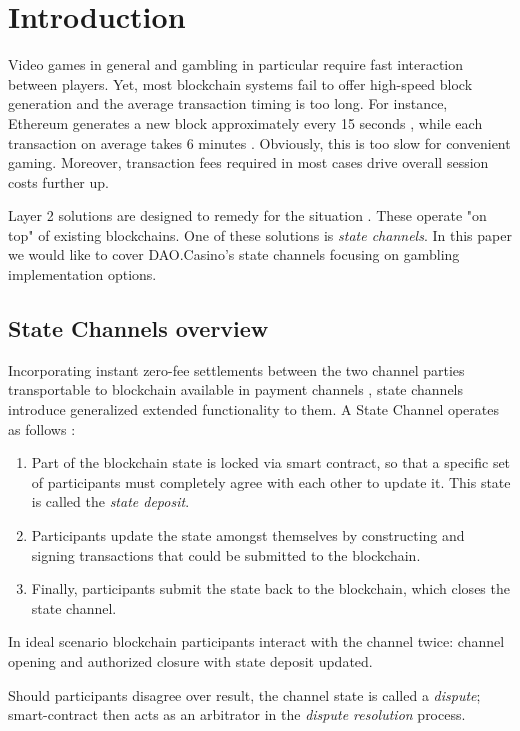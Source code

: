 \section{Introduction}
	Video games in general and gambling in particular require fast interaction between players. Yet, most blockchain systems fail to offer high-speed block generation and the average transaction timing is too long. For instance, Ethereum generates a new block approximately every 15 seconds \cite{bib2}, while each transaction on average takes 6 minutes \cite{bib3}. Obviously, this is too slow for convenient gaming. Moreover, transaction fees required in most cases drive overall session costs further up.


	Layer 2 solutions are designed to remedy for the situation \cite{bib4}. These operate "on top" of existing blockchains. One of these solutions is \textit{state channels}. In this paper we would like to cover DAO.Casino's state channels focusing on gambling implementation options.


		\subsection {State Channels overview}
	Incorporating instant zero-fee settlements between the two channel parties transportable to blockchain available in payment channels \cite{bib11}, state channels introduce generalized extended functionality to them. 
	A State Channel operates as follows \cite{bib5}:
	\begin{enumerate}
		\item Part of the blockchain state is locked via smart contract, so that a specific set of participants must completely agree with each other to update it. This state is called the \textit {state deposit}.
		\item Participants update the state amongst themselves by constructing and signing transactions that could be submitted to the blockchain.
		\item Finally, participants submit the state back to the blockchain, which closes the state channel.
	\end{enumerate}

	In ideal scenario blockchain participants interact with the channel twice: channel opening and authorized closure with state deposit updated.

	Should participants disagree over result, the channel state is called a \textit {dispute}; smart-contract then acts as an arbitrator in the \textit {dispute resolution} process.

